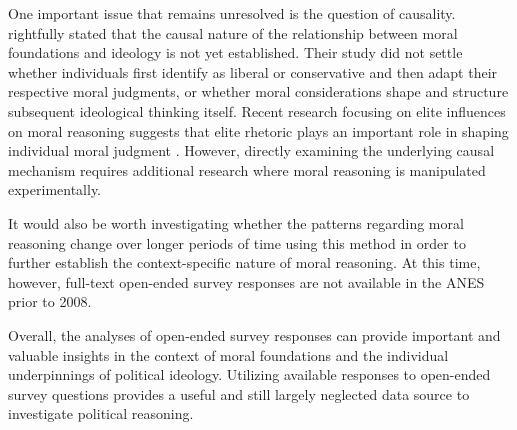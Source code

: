 \documentclass[12pt]{article}
\begin{document}
One important issue that remains unresolved is the question of causality. \citet{graham2009liberals} rightfully stated that the causal nature of the relationship between moral foundations and ideology is not yet established. Their study did not settle whether individuals first identify as liberal or conservative and then adapt their respective moral judgments, or whether moral considerations shape and structure subsequent ideological thinking itself. Recent research focusing on elite influences on moral reasoning suggests that elite rhetoric plays an important role in shaping individual moral judgment \citep[see for example][]{clifford2013words,clifford2015concerns}. However, directly examining the underlying causal mechanism requires additional research where moral reasoning is manipulated experimentally.

It would also be worth investigating whether the patterns regarding moral reasoning change over longer periods of time using this method in order to further establish the context-specific nature of moral reasoning. At this time, however, full-text open-ended survey responses are not available in the ANES prior to 2008.

Overall, the analyses of open-ended survey responses can provide important and valuable insights in the context of moral foundations and the individual underpinnings of political ideology. Utilizing available responses to open-ended survey questions provides a useful and still largely neglected data source to investigate political reasoning.




\clearpage


\end{document}
